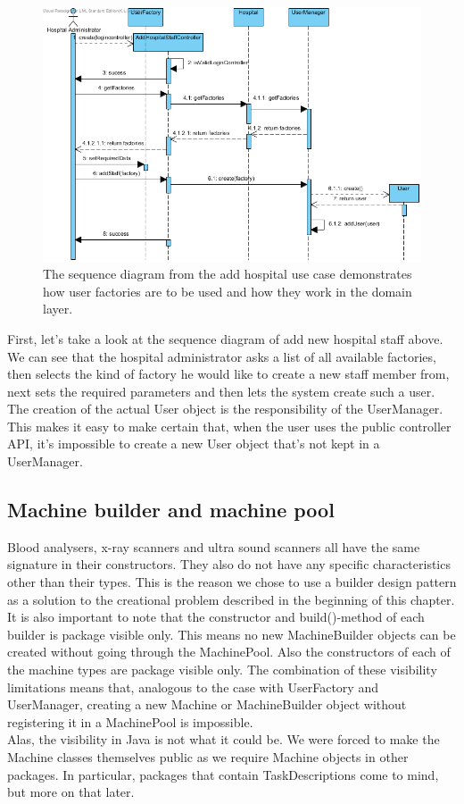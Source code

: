 \documentclass[12pt]{article}
\begin{document}
\begin{figure}[h!]
\includegraphics[width=175mm]{addstaff.png}
\caption{The sequence diagram from the add hospital use case demonstrates how user factories are to be used and how they work in the domain layer.}
\label{addHospitalStaffSD}
\end{figure}

First, let's take a look at the sequence diagram of add new hospital staff above. We can see that the hospital administrator asks a list of all available factories, then selects the kind of factory he would like to create a new staff member from, next sets the required parameters and then lets the system create such a user.\\
The creation of the actual User object is the responsibility of the UserManager. This makes it easy to make certain that, when the user uses the public controller API, it's impossible to create a new User object that's not kept in a UserManager.

\subsection{Machine builder and machine pool}
Blood analysers, x-ray scanners and ultra sound scanners all have the same signature in their constructors. They also do not have any specific characteristics other than their types. This is the reason we chose to use a builder design pattern as a solution to the creational problem described in the beginning of this chapter.\\
It is also important to note that the constructor and build()-method of each builder is package visible only. This means no new MachineBuilder objects can be created without going through the MachinePool. Also the constructors of each of the machine types are package visible only. The combination of these visibility limitations means that, analogous to the case with UserFactory and UserManager, creating a new Machine or MachineBuilder object without registering it in a MachinePool is impossible.\\
Alas, the visibility in Java is not what it could be. We were forced to make the Machine classes themselves public as we require Machine objects in other packages. In particular, packages that contain TaskDescriptions come to mind, but more on that later.
\end{document}
